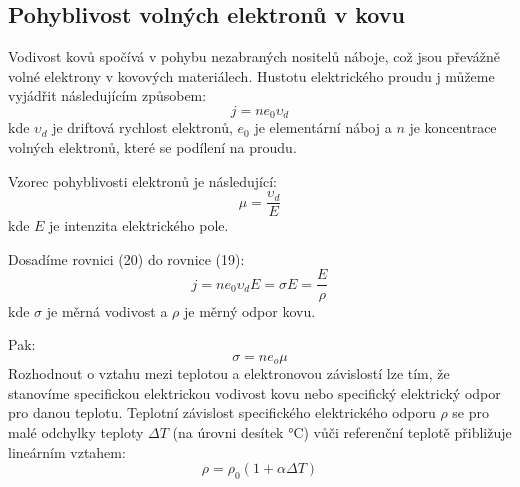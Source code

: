\documentclass[a4paper,11pt]{article}
\begin{document}
\begin{minipage}[t]{0.5\textwidth}
        \subsection{Pohyblivost volných elektronů v kovu}
            Vodivost kovů spočívá v pohybu nezabraných nositelů náboje, což jsou převážně volné elektrony v kovových materiálech. Hustotu elektrického proudu j můžeme vyjádřit následujícím způsobem:
        \begin{equation}
            j = ne_0 \upsilon_d
        \end{equation}
        kde $\upsilon_d$ je driftová rychlost elektronů, $e_0$ je elementární náboj a $n$ je koncentrace volných elektronů, které se podílení na proudu.
        \par Vzorec pohyblivosti elektronů je následující: 
        \begin{equation}
            \mu = \frac{\upsilon_d}{E}
        \end{equation}
        kde $E$ je intenzita elektrického pole. 
        \par Dosadíme rovnici (20) do rovnice (19):
        \begin{equation}
            j = ne_0 \upsilon_d E = \sigma E = \frac{E}{\rho}
        \end{equation}
        kde $\sigma$ je měrná vodivost a $\rho$ je měrný odpor kovu.
        \par Pak: 
        \begin{equation}
            \sigma = n e_o \mu
        \end{equation}
        Rozhodnout o vztahu mezi teplotou a elektronovou závislostí lze tím, že stanovíme specifickou elektrickou vodivost kovu nebo specifický elektrický odpor pro danou teplotu. Teplotní závislost specifického elektrického odporu $\rho$ se pro malé odchylky teploty $\Delta T$ (na úrovni desítek °C) vůči referenční teplotě přibližuje lineárním vztahem:
        \begin{equation}
            \rho = \rho_0 \left(1 + \alpha \Delta T\right)
        \end{equation}
    \end{minipage}
    \newpage
\end{document}
